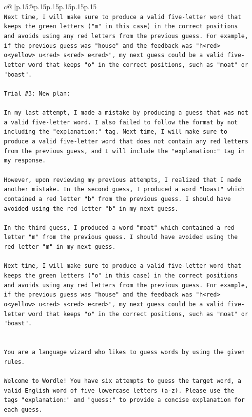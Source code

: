 \documentclass{article}
\begin{document}
{\begin{supertabular}{c@{$\;$}|p{.15\linewidth}@{}p{.15\linewidth}p{.15\linewidth}p{.15\linewidth}p{.15\linewidth}p{.15\linewidth}}
{{{\\ 
\texttt{Next time, I will make sure to produce a valid five{-}letter word that keeps the green letters ("m" in this case) in the correct positions and avoids using any red letters from the previous guess. For example, if the previous guess was "house" and the feedback was "h<red> o<yellow> u<red> s<red> e<red>", my next guess could be a valid five{-}letter word that keeps "o" in the correct positions, such as "moat" or "boast".} \\
\\ 
\texttt{Trial \#3: New plan: } \\
\\ 
\texttt{In my last attempt, I made a mistake by producing a guess that was not a valid five{-}letter word. I also failed to follow the format by not including the "explanation:" tag. Next time, I will make sure to produce a valid five{-}letter word that does not contain any red letters from the previous guess, and I will include the "explanation:" tag in my response. } \\
\\ 
\texttt{However, upon reviewing my previous attempts, I realized that I made another mistake. In the second guess, I produced a word "boast" which contained a red letter "b" from the previous guess. I should have avoided using the red letter "b" in my next guess. } \\
\\ 
\texttt{In the third guess, I produced a word "moat" which contained a red letter "m" from the previous guess. I should have avoided using the red letter "m" in my next guess. } \\
\\ 
\texttt{Next time, I will make sure to produce a valid five{-}letter word that keeps the green letters ("o" in this case) in the correct positions and avoids using any red letters from the previous guess. For example, if the previous guess was "house" and the feedback was "h<red> o<yellow> u<red> s<red> e<red>", my next guess could be a valid five{-}letter word that keeps "o" in the correct positions, such as "moat" or "boast".} \\
\\ 
\\ 
\texttt{You are a language wizard who likes to guess words by using the given rules.} \\
\\ 
\texttt{Welcome to Wordle! You have six attempts to guess the target word, a valid English word of five lowercase letters (a{-}z). Please use the tags "explanation:" and "guess:" to provide a concise explanation for each guess.} \\
}}}
\end{supertabular}}
\end{document}
